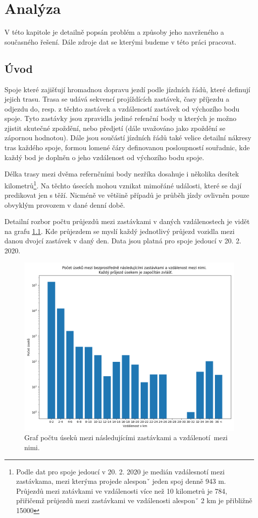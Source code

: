 
\chapter{Analýza}

V této kapitole je detailně popsán problém a způsoby jeho navrženého a současného řešení. Dále zdroje dat se kterými budeme v této práci pracovat.

\section{Úvod}

Spoje které zajišťují hromadnou dopravu jezdí podle jízdních řádů, které definují jejich trasu. Trasa se udává sekvencí projíždících zastávek, časy příjezdu a odjezdu do, resp. z těchto zastávek a vzdáleností zastávek od výchozího bodu spoje. Tyto zastávky jsou zpravidla jediné refenční body u kterých je možno zjistit skutečné zpoždění, nebo předjetí (dále uvažováno jako zpoždění se zápornou hodnotou). Dále jsou součástí jízdních řádů také velice detailní nákresy tras každého spoje, formou lomené čáry definovanou posloupností souřadnic, kde každý bod je doplněn o jeho vzdálenost od výchozího bodu spoje.

\bigbreak

Délka trasy mezi dvěma refernčními body nezříka dosahuje i několika desítek kilometrů\footnote{Podle dat pro spoje jedoucí v 20. 2. 2020 je medián vzdálesnotí mezi zastávkama, mezi kterýma projede alesponˇ jeden spoj denně 943 m. Průjezdů mezi zatávkami ve vzdálenosti více než 10 kilometrů je 784, přiřičemž průjezdů mezi zastávkami ve vzdálenosti alesponˇ 2 km je přibližně 15000}. Na těchto úsecích mohou vznikat mimořáné události, které se dají predikovat jen s těží. Nicméně ve většině případů je průběh jízdy ovlivněn pouze obvyklým provozem v dané denní době.

Detailní rozbor počtu průjezdů mezi zastávkami v daných vzdálenostech je vidět na grafu \ref{fig:stop_distances_result}. Kde průjezdem se myslí každý jednotlivý průjezd vozidla mezi danou dvojcí zastávek v daný den. Data jsou platná pro spoje jedoucí v 20. 2. 2020.

\begin{figure}
	\centering
  \includegraphics[width=0.6\linewidth]{../img/stop_distances_plot_2020-02-20.png}
  \caption{Graf počtu úseků mezi následujícími zastávkami a vzdálenotí mezi nimi.}
  \label{fig:stop_distances_result}
\end{figure}

